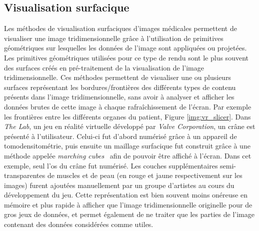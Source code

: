 {{        \subsection{Visualisation surfacique}
        {
            Les méthodes de visualisation surfaciques d'images médicales permettent de visualiser une image tridimensionnelle grâce à l'utilisation de primitives géométriques sur lesquelles les données de l'image sont appliquées ou projetées. Les primitives géométriques utilisées pour ce type de rendu sont le plus souvent des surfaces créés en pré-traitement de la visualisation de l'image tridimensionnelle. Ces méthodes permettent de visualiser une ou plusieurs surfaces représentant les bordures/frontières des différents types de contenu présents dans l'image tridimensionnelle, sans avoir à analyser et afficher les données brutes de cette image à chaque rafraîchissement de l'écran. Par exemple les frontières entre les différents organes du patient, Figure \ref{img:vr_slicer}. Dans \textit{The Lab}, un jeu en réalité virtuelle développé par \textit{Valve Corporation}, un crâne est présenté à l'utilisateur. Celui-ci fut d'abord numérisé grâce à un appareil de tomodensitométrie, puis ensuite un maillage surfacique fut construit grâce à une méthode appelée \textit{marching cubes}~\cite{cite_marching_cubes} afin de pouvoir être affiché à l'écran. Dans cet exemple, seul l'os du crâne fut numérisé. Les couches supplémentaires semi-transparentes de muscles et de peau (en rouge et jaune respectivement sur les images) furent ajoutées manuellement par un groupe d'artistes au cours du développement du jeu. Cette représentation est bien souvent moins onéreuse en mémoire et plus rapide à afficher que l'image tridimensionnelle originelle pour de gros jeux de données, et permet également de ne traiter que les parties de l'image contenant des données considérées comme utiles.

}}}
